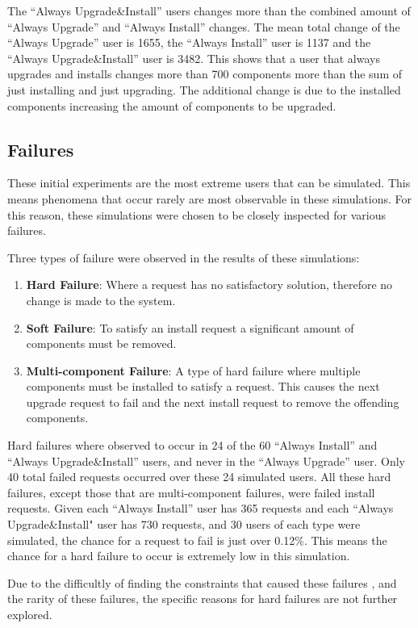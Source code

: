The ``Always Upgrade\&Install'' users changes more than the combined amount of ``Always Upgrade'' and ``Always Install'' changes.
The mean total change of the ``Always Upgrade'' user is 1655, the ``Always Install'' user is 1137 and the ``Always Upgrade\&Install'' user is 3482.
This shows that a user that always upgrades and installs changes more than 700 components more than the sum of just installing and just upgrading.
The additional change is due to the installed components increasing the amount of components to be upgraded.

\subsection{Failures}
These initial experiments are the most extreme users that can be simulated.
This means phenomena that occur rarely are most observable in these simulations.
For this reason, these simulations were chosen to be closely inspected for various failures.

Three types of failure were observed in the results of these simulations:
\begin{enumerate}
  \item \textbf{Hard Failure}: Where a request has no satisfactory solution, therefore no change is made to the system.
  \item \textbf{Soft Failure}: To satisfy an install request a significant amount of components must be removed.
  \item \textbf{Multi-component Failure}: A type of hard failure where multiple components must be installed to satisfy a request. 
  This causes the next upgrade request to fail and the next install request to remove the offending components.
\end{enumerate}

Hard failures where observed to occur in 24 of the 60 ``Always Install'' and ``Always Upgrade\&Install'' users, and never in the ``Always Upgrade'' user.
Only 40 total failed requests occurred over these 24 simulated users.
All these hard failures, except those that are multi-component failures, were failed install requests.
Given each ``Always Install'' user has 365 requests and each ``Always Upgrade\&Install" user has 730 requests, 
and 30 users of each type were simulated, the chance for a request to fail is just over 0.12\%.
This means the chance for a hard failure to occur is extremely low in this simulation.

Due to the difficultly of finding the constraints that caused these failures \citep{quickxplain},
and the rarity of these failures, the specific reasons for hard failures are not further explored.

